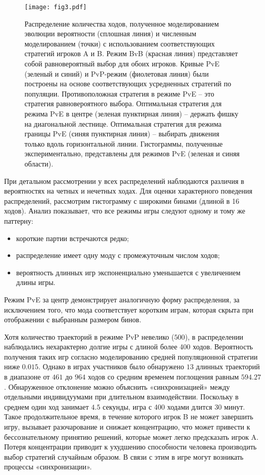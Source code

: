 \begin{figure*}[t]
    \begin{center}
    \texttt{[image: fig3.pdf]}
    \caption{
        Распределение количества ходов, полученное моделированием эволюции вероятности (сплошная линия) и численным моделированием (точки) с использованием соответствующих стратегий игроков A и B. 
        Режим BvB (красная линия) представляет собой равновероятный выбор для обоих игроков. Кривые PvE (зеленый и синий) и PvP-режим (фиолетовая линия) 
        были построены на основе соответствующих усредненных стратегий по популяции. Противоположная стратегия в режиме PvE – это стратегия равновероятного выбора. 
        Оптимальная стратегия для режима PvE в центре (зеленая пунктирная линия) – держать фишку на диагональной лестнице. Оптимальная стратегия для режима границы PvE 
        (синяя пунктирная линия) – выбирать движения только вдоль горизонтальной линии. Гистограммы, полученные экспериментально, представлены для режимов PvE 
        (зеленая и синяя области).
    }  
    \label{fig:distribution_time}
    \end{center}
\end{figure*}

При детальном рассмотрении у всех распределений наблюдаются различия в вероятностях на четных и нечетных ходах. 
Для оценки характерного поведения распределений, рассмотрим гистограмму с широкими бинами (длиной в 16 ходов). 
Анализ показывает, что все режимы игры следуют одному и тому же паттерну:
\begin{itemize}
\item короткие партии встречаются редко;
\item распределение имеет одну моду с промежуточным числом ходов;
\item вероятность длинных игр экспоненциально уменьшается с увеличением длины игры.
\end{itemize}

Режим PvE за центр демонстрирует аналогичную форму распределения, за исключением того, что мода соответствует коротким играм, 
которая скрыта при отображении с выбранным размером бинов.

Хотя количество траекторий в режиме PvP невелико ($500$), в распределении наблюдались нехарактерно долгие игры с длиной более 400 ходов. 
Вероятность получения таких игр согласно моделированию средней популяционной стратегии ниже $0.015$. 
Однако в играх участников было обнаружено $13$ длинных траекторий в диапазоне от $461$ до $964$ ходов со средним временем поглощения равным $594.27$. 
Обнаруженное отклонение можно объяснить «синхронизацией» между отдельными индивидуумами при длительном взаимодействии. 
Поскольку в среднем один ход занимает $4.5$ секунды, игра с 400 ходами длится 30 минут. 
Такое продолжительное время, в течение которого игрок B не может завершить игру, вызывает разочарование и снижает концентрацию, 
что может привести к бессознательному принятию решений, которые может легко предсказать игрок A. 
Потеря концентрации приводит к ухудшению способности человека производить выбор стратегий случайным образом. 
В связи с этим в игре могут возникать процессы «синхронизации».

